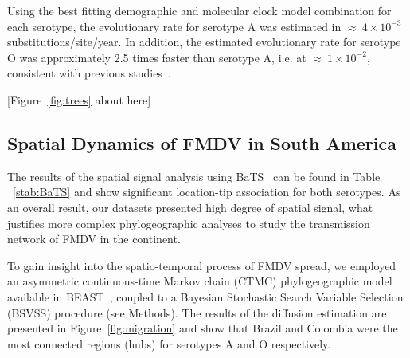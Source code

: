 \documentclass[10pt]{article}
\begin{document}
Using the best fitting demographic and molecular clock model combination for each serotype, the evolutionary rate for serotype A was estimated in  $\approx~4 \times 10^{-3}$ substitutions/site/year.
In addition, the estimated evolutionary rate for serotype O was approximately 2.5 times faster than serotype A, i.e. at $\approx~1 \times 10^{-2}$, consistent with previous studies~\cite{tully,Carvalho2013,Muellner2011}. 
\begin{center}
 [Figure~\ref{fig:trees} about here]
\end{center}

\subsection*{Spatial Dynamics of FMDV in South America}

The results of the spatial signal analysis using BaTS~\cite{bats} can be found in Table ~\ref{stab:BaTS} and show significant location-tip association for both serotypes.
As an overall result, our datasets presented high degree of spatial signal, what justifies more complex phylogeographic analyses to study the transmission network of FMDV in the continent.

To gain insight into the spatio-temporal process of FMDV spread, we employed an asymmetric continuous-time Markov chain (CTMC) phylogeographic model~\cite{roots} available in BEAST~\cite{beast2012}, coupled to a Bayesian Stochastic Search Variable Selection (BSVSS) procedure (see Methods).
The results of the diffusion estimation are presented in Figure~\ref{fig:migration} and show that Brazil and Colombia were the most connected regions (hubs) for serotypes A and O respectively.
\end{document}
